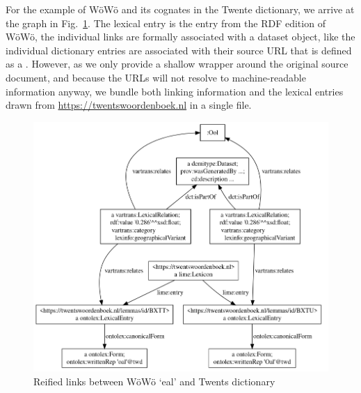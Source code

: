 For the example of WöWö  and its cognates in the Twente dictionary, we arrive at the graph in Fig.\ \ref{fig-links}. The lexical entry  is the entry from the RDF edition of WöWö, the individual links are formally associated with a dataset object, like the individual dictionary entries are associated with their source URL that is defined as a . However, as we only provide a shallow wrapper around the original source document, and because the URLs will not resolve to machine-readable information anyway, we bundle both linking information and the lexical entries drawn from \url{https://twentswoordenboek.nl} in a single file.

\begin{figure}
    \centering
    \includegraphics[width=0.9\linewidth]{img/links-vis.png}
    \caption{Reified  links between WöWö  `eal' and Twents dictionary}
    \label{fig-links}
\end{figure}

